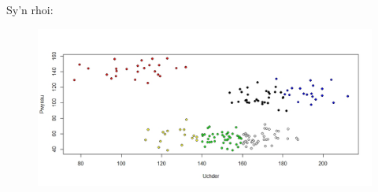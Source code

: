 Sy'n rhoi:

\begin{figure}[H]
\begin{center}
\includegraphics[width=0.5\linewidth]{../img/6clwstwrR.jpeg}
\end{center}
\end{figure}



